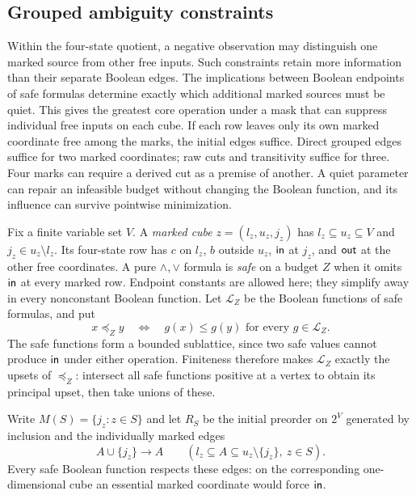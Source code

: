 \subsection{Grouped ambiguity constraints}
\label{app:core-grouped-cubes}

Within the four-state quotient, a negative observation may distinguish
one marked source from other free inputs. Such constraints retain more
information than their separate Boolean edges. The implications between
Boolean endpoints of safe formulas determine exactly which additional
marked sources must be quiet. This gives the greatest core operation
under a mask that can suppress individual free inputs on each cube.
If each row leaves only its own marked coordinate free among the marks,
the initial edges suffice. Direct grouped edges
suffice for two marked coordinates; raw cuts and transitivity suffice
for three. Four marks can require a derived cut as a premise of another.
A quiet parameter can repair an infeasible budget without changing the
Boolean function, and its influence can survive pointwise minimization.

Fix a finite variable set $V$. A \emph{marked cube} $z=(l_z,u_z,j_z)$ has
$l_z\subseteq u_z\subseteq V$ and $j_z\in u_z\setminus l_z$.
Its four-state row has $c$ on $l_z$, $b$ outside $u_z$,
$\mathsf{in}$ at $j_z$, and $\mathsf{out}$ at the other free coordinates.
A pure $\wedge,\vee$ formula is \emph{safe} on a budget $Z$ when
it omits $\mathsf{in}$ at every marked row. Endpoint constants are
allowed here; they simplify away in every nonconstant Boolean function.
Let $\mathcal L_Z$ be the Boolean functions of safe formulas, and put
\[
 x\preceq_Z y\quad\Longleftrightarrow\quad
 g(x)\leq g(y)\text{ for every }g\in\mathcal L_Z.
\]
The safe functions form a bounded sublattice, since two safe values
cannot produce $\mathsf{in}$ under either operation. Finiteness therefore
makes $\mathcal L_Z$ exactly the upsets of $\preceq_Z$: intersect all
safe functions positive at a vertex to obtain its principal upset,
then take unions of these.

Write $M(S)=\{j_z:z\in S\}$ and let $R_S$ be the initial preorder
on $2^V$ generated by inclusion and the individually marked edges
\[
 A\cup\{j_z\}\longrightarrow A
 \qquad(l_z\subseteq A\subseteq u_z\setminus\{j_z\},\ z\in S).
\]
Every safe Boolean function respects these edges: on the corresponding
one-dimensional cube an essential marked coordinate would force
$\mathsf{in}$.

